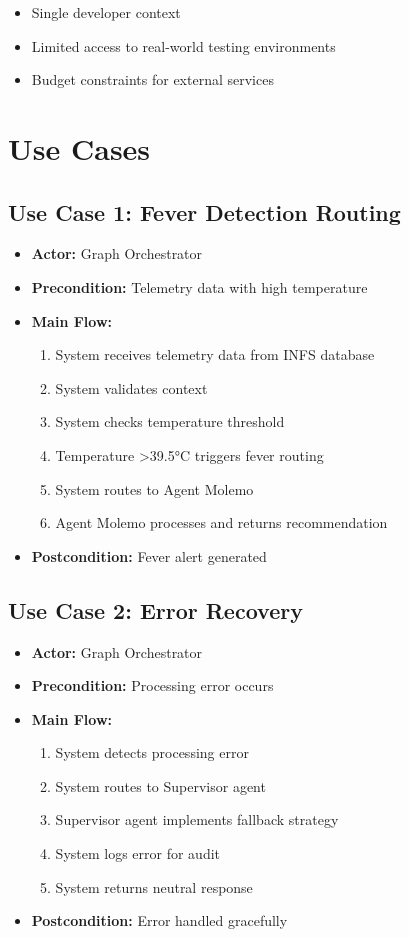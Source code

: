 \begin{itemize}
    \item Single developer context
    \item Limited access to real-world testing environments
    \item Budget constraints for external services
\end{itemize}

\section{Use Cases}

\subsection{Use Case 1: Fever Detection Routing}

\begin{itemize}
    \item \textbf{Actor:} Graph Orchestrator
    \item \textbf{Precondition:} Telemetry data with high temperature
    \item \textbf{Main Flow:}
    \begin{enumerate}
        \item System receives telemetry data from INFS database
        \item System validates context
        \item System checks temperature threshold
        \item Temperature >39.5°C triggers fever routing
        \item System routes to Agent Molemo
        \item Agent Molemo processes and returns recommendation
    \end{enumerate}
    \item \textbf{Postcondition:} Fever alert generated
\end{itemize}

\subsection{Use Case 2: Error Recovery}

\begin{itemize}
    \item \textbf{Actor:} Graph Orchestrator
    \item \textbf{Precondition:} Processing error occurs
    \item \textbf{Main Flow:}
    \begin{enumerate}
        \item System detects processing error
        \item System routes to Supervisor agent
        \item Supervisor agent implements fallback strategy
        \item System logs error for audit
        \item System returns neutral response
    \end{enumerate}
    \item \textbf{Postcondition:} Error handled gracefully
\end{itemize}

